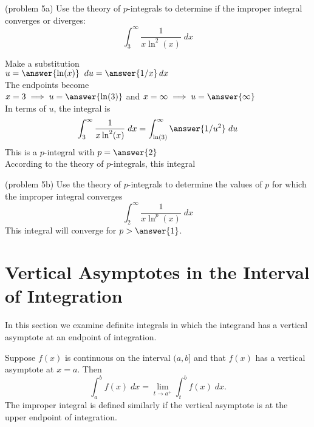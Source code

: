 \documentclass[handout]{ximera}
\begin{document}
\begin{problem}(problem 5a)
Use the theory of $p$-integrals to determine if the improper integral converges or diverges:
\[
\int_3^\infty \frac{1}{x\ln^2(x)} \; dx
\]

Make a substitution\\
$u = \answer{\ln(x)} \;\; du = \answer{1/x} \, dx$\\
The endpoints become\\
$x = 3 \implies u = \answer{\ln(3)}$ and $x= \infty \implies u = \answer{\infty}$\\
In terms of $u$, the integral is
\[
\int_3^\infty \frac{1}{x\ln^2(x)} \; dx = \int_{\ln(3)}^\infty \answer{1/u^2} \; du
\]
This is a $p$-integral with $p = \answer{2}$\\
According to the theory of $p$-integrals, this integral
\begin{multipleChoice}
\end{multipleChoice}
\end{problem}


\begin{problem}(problem 5b)
Use the theory of $p$-integrals to determine the values of $p$ for which the improper integral converges
\[
\int_2^\infty \frac{1}{x \ln^p(x)} \; dx
\]
This integral will converge for $p > \answer{1}$.
\end{problem}



\section{Vertical Asymptotes in the Interval of Integration}

In this section we examine definite integrals in which the integrand has a vertical asymptote at an endpoint of integration.

\begin{definition}
Suppose $f(x)$ is continuous on the interval $(a, b]$ and that $f(x)$ has a vertical asymptote at $x = a$.
Then
\[
\int_a^b f(x) \; dx = \lim_{t \to a^+} \int_t^b f(x) \; dx.
\]
The improper integral is defined similarly if the vertical asymptote is at the upper endpoint of integration.
\end{definition}
\end{document}
